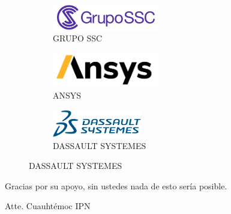 \documentclass[letterpaper,12pt]{article} %
\begin{document}
    \hspace{0.3cm}
    \begin{figure}[h!]
    \centering
    \begin{subfigure}[b]{0.3\textwidth}
        \centering
        \includegraphics[height=1.1cm]{SSC.png}
        \vspace{0.2cm}
        \caption{GRUPO SSC}
        \label{fig:SSC}
    \end{subfigure}
    \hfill
    \begin{subfigure}[b]{0.3\textwidth}
        \centering
        \includegraphics[height=1.5cm]{ANSYS.png}
        \caption{ANSYS}
        \label{fig:ANSYS}
    \end{subfigure}
    \hfill
    \begin{subfigure}[b]{0.3\textwidth}
        \centering
        \includegraphics[height=1.2cm]{DASSAULT.png}
        \vspace{0.2cm}
        \caption{DASSAULT SYSTEMES}
        \label{fig:DASSAULT}
    \end{subfigure}
    \end{figure}
    
    \hfill


    Gracias por su apoyo, sin ustedes nada de esto sería posible.

    Atte. Cuauhtémoc IPN

    
\end{document}
